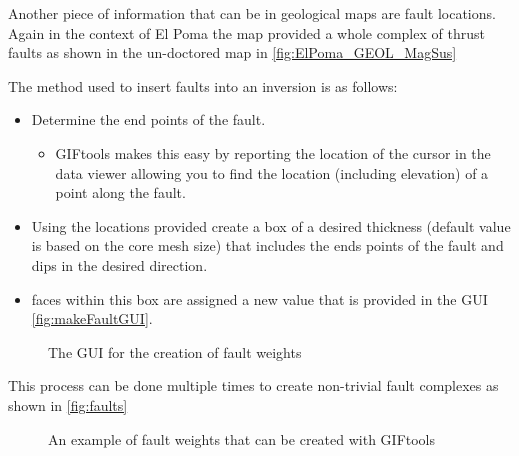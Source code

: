 Another piece of information that can be in geological maps are fault locations. Again in the context of El Poma the map provided a whole complex of thrust faults as shown in the un-doctored map in \autoref{fig:ElPoma_GEOL_MagSus}

The method used to insert faults into an inversion is as follows:

\begin{itemize}
\item Determine the end points of the fault.
\begin{itemize}
	\item GIFtools makes this easy by reporting the location of the cursor in the data viewer allowing you to find the location (including elevation) of a point along the fault.
\end{itemize}
\item Using the locations provided create a box of a desired thickness (default value is based on the core mesh size) that includes the ends points of the fault and dips in the desired direction.
\item faces within this box are assigned a new value that is provided in the GUI \autoref{fig:makeFaultGUI}.
\end{itemize}

\begin{figure} [h]
    \centering
    \caption{The GUI for the creation of fault weights}
    \label{fig:makeFaultGUI}
\end{figure}

This process can be done multiple times to create non-trivial fault complexes as shown in \autoref{fig:faults}

\begin{figure} [h]
    \centering
    \caption{An example of fault weights that can be created with GIFtools}
    \label{fig:faults}
\end{figure}
\FloatBarrier

